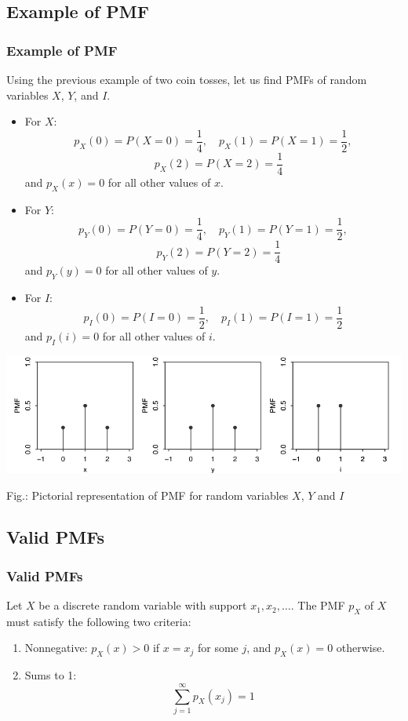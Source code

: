 \documentclass{beamer}
\begin{document}
\subsection{Example of PMF}
\begin{frame}
    \frametitle{Example of PMF}
    Using the previous example of two coin tosses, let us find PMFs of random variables $X$, $Y$, and $I$.
    \begin{itemize}
        \item For $X$:
        $$p_X (0) = P (X = 0) = \frac{1}{4}, \quad p_X (1) = P (X = 1) = \frac{1}{2},$$ $$ \quad p_X (2) = P (X = 2) = \frac{1}{4}$$
        and $p_X (x) = 0$ for all other values of $x$.
        
        \item For $Y$:
        \[p_Y (0) = P (Y = 0) = \frac{1}{4}, \quad p_Y (1) = P (Y = 1) = \frac{1}{2},\] \[ \quad p_Y (2) = P (Y = 2) = \frac{1}{4}\]
        and $p_Y (y) = 0$ for all other values of $y$.
    \end{itemize} 
\end{frame}


\begin{frame}
    \begin{itemize}
        \item For $I$:
        $$p_I (0) = P (I = 0) = \frac{1}{2}, \quad p_I (1) = P (I = 1) = \frac{1}{2}$$
        and $p_I (i) = 0$ for all other values of $i$.
    \end{itemize}
    
    \includegraphics[width=1\textwidth]{pmf.png}
    
    Fig.: Pictorial representation of PMF for random variables $X$, $Y$ and $I$

\end{frame}
        
\subsection{Valid PMFs}
\begin{frame}
    \frametitle{Valid PMFs}
    Let $X$ be a discrete random variable with support $x_1, x_2, \ldots$. The PMF $p_X$ of $X$ must satisfy the following two criteria:
    \begin{enumerate}
        \item Nonnegative: $p_X (x) > 0$ if $x = x_j$ for some $j$, and $p_X (x) = 0$ otherwise.
        \item Sums to 1: 
        $$\sum_{j=1}^{\infty} p_X(x_j) = 1$$
    \end{enumerate}
\end{frame}
\end{document}
